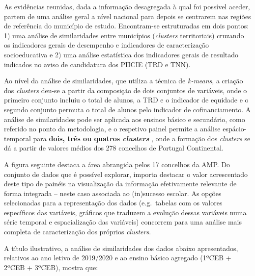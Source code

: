 \documentclass[
]{book}
\begin{document}
As evidências reunidas, dada a informação desagregada à qual foi possível aceder, partem de uma análise geral a nível nacional para depois se centrarem nas regiões de referência do município de estudo. Encontram-se estruturadas em dois pontos: 1) uma análise de similaridades entre municípios (\emph{clusters} territoriais) cruzando os indicadores gerais de desempenho e indicadores de caracterização socioeducativa e 2) uma análise estatística dos indicadores gerais de resultado indicados no aviso de candidatura dos PIICIE (TRD e TNN).

Ao nível da análise de similaridades, que utiliza a técnica de \emph{k-means}, a criação dos \emph{clusters} deu-se a partir da composição de dois conjuntos de variáveis, onde o primeiro conjunto incluiu o total de alunos, a TRD e o indicador de equidade e o segundo conjunto permuta o total de alunos pelo indicador de cofinanciamento. A análise de similaridades pode ser aplicada aos ensinos básico e secundário, como referido no ponto da metodologia, e o respetivo painel permite a análise espácio-temporal para \textbf{dois, três ou quatros \emph{clusters} }, onde a formação dos \emph{clusters} se dá a partir de valores médios dos 278 concelhos de Portugal Continental.

A figura seguinte destaca a área abrangida pelos 17 concelhos da AMP. Do conjunto de dados que é possível explorar, importa destacar o valor acrescentado deste tipo de painéis na visualização da informação efetivamente relevante de forma integrada -- neste caso associada ao (in)sucesso escolar. As opções selecionadas para a representação dos dados (e.g.~tabelas com os valores específicos das variáveis, gráficos que traduzem a evolução dessas variáveis numa série temporal e espacialização das variáveis) concorrem para uma análise mais completa de caracterização dos próprios \emph{clusters}.

A título ilustrativo, a análise de similaridades dos dados abaixo apresentados, relativos ao ano letivo de 2019/2020 e ao ensino básico agregado (1ºCEB + 2ºCEB + 3ºCEB), mostra que:
\end{document}
